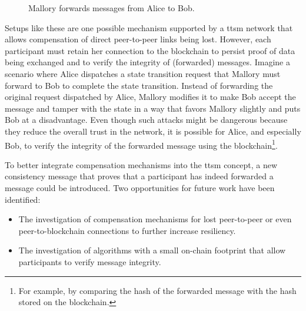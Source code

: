 \begin{figure}[h]
    \caption{Mallory forwards messages from Alice to Bob.}
    \label{fig:evaluation:static_analysis:partially_connected_mesh}
\end{figure}

Setups like these are one possible mechanism supported by a \gls{ttsm} network that allows compensation of direct peer-to-peer links being lost. However, each participant must retain her connection to the blockchain to persist proof of data being exchanged and to verify the integrity of (forwarded) messages. Imagine a scenario where Alice dispatches a state transition request that Mallory must forward to Bob to complete the state transition. Instead of forwarding the original request dispatched by Alice, Mallory modifies it to make Bob accept the message and tamper with the state in a way that favors Mallory slightly and puts Bob at a disadvantage. Even though such attacks might be dangerous because they reduce the overall trust in the network, it is possible for Alice, and especially Bob, to verify the integrity of the forwarded message using the blockchain\footnote{For example, by comparing the hash of the forwarded message with the hash stored on the blockchain.}.

To better integrate compensation mechanisms into the \gls{ttsm} concept, a new consistency message that proves that a participant has indeed forwarded a message could be introduced. Two opportunities for future work have been identified:

\begin{itemize}
    \item The investigation of compensation mechanisms for lost peer-to-peer or even peer-to-blockchain connections to further increase resiliency.
    \item The investigation of algorithms with a small on-chain footprint that allow participants to verify message integrity.
\end{itemize}

